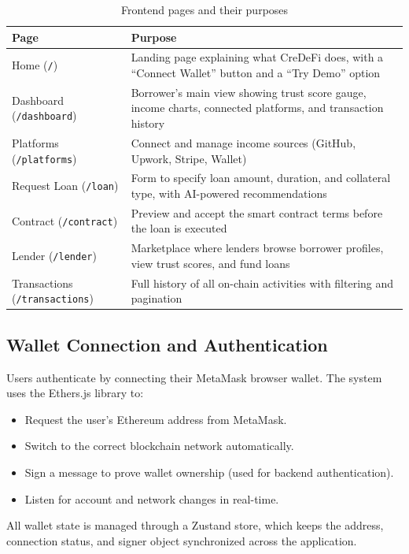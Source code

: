 \documentclass[12pt, a4paper]{article}
\begin{document}
\begin{table}[H]
\centering
\caption{Frontend pages and their purposes}
\begin{tabularx}{\textwidth}{l X}
\toprule
\textbf{Page} & \textbf{Purpose} \\
\midrule
Home (\texttt{/}) & Landing page explaining what CreDeFi does, with a ``Connect Wallet'' button and a ``Try Demo'' option \\
Dashboard (\texttt{/dashboard}) & Borrower's main view showing trust score gauge, income charts, connected platforms, and transaction history \\
Platforms (\texttt{/platforms}) & Connect and manage income sources (GitHub, Upwork, Stripe, Wallet) \\
Request Loan (\texttt{/loan}) & Form to specify loan amount, duration, and collateral type, with AI-powered recommendations \\
Contract (\texttt{/contract}) & Preview and accept the smart contract terms before the loan is executed \\
Lender (\texttt{/lender}) & Marketplace where lenders browse borrower profiles, view trust scores, and fund loans \\
Transactions (\texttt{/transactions}) & Full history of all on-chain activities with filtering and pagination \\
\bottomrule
\end{tabularx}
\end{table}

\subsection{Wallet Connection and Authentication}

Users authenticate by connecting their MetaMask browser wallet. The system uses the Ethers.js library to:

\begin{itemize}[nosep]
    \item Request the user's Ethereum address from MetaMask.
    \item Switch to the correct blockchain network automatically.
    \item Sign a message to prove wallet ownership (used for backend authentication).
    \item Listen for account and network changes in real-time.
\end{itemize}

All wallet state is managed through a Zustand store, which keeps the address, connection status, and signer object synchronized across the application.
\end{document}
